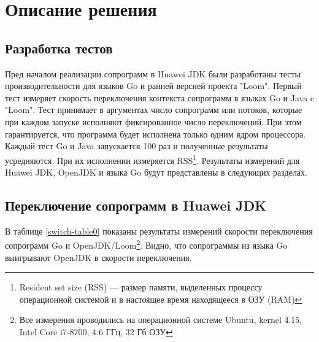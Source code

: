\section{Описание решения}
	
	\subsection{Разработка тестов}
	Пред началом реализации сопрограмм в Huawei JDK были разработаны тесты
	производительности для языков Go и ранней версией проекта "Loom". 
	Первый тест измеряет скорость переключения контекста сопрограмм в языках Go и
	Java c "Loom". Тест принимает в аргументах число сопрограмм или потоков, которые при каждом запуске
	исполняют фиксированное число переключений. При этом гарантируется, что программа будет исполнена 
	только одним ядром процессора. Каждый тест Go и Java запускается 100 раз и полученные результаты усредняются.
	При их исполнении измеряется RSS\footnote{Resident set size (RSS) — размер памяти, 
	выделенных процессу операционной системой и в настоящее время находящееся в ОЗУ (RAM)}.
	Результаты измерений для Huawei JDK, OpenJDK и языка Go будут представлены в следующих разделах.
	\clearpage
	
	\subsection{Переключение сопрограмм в Huawei JDK}
	В таблице \ref{switch-table0} показаны результаты измерений скорости переключения сопрограмм Go и 
	OpenJDK/Loom\footnote{Все измерения проводились на операционной системе Ubuntu, kernel 4.15, Intel Core i7-8700,
	4.6 ГГц, 32 Гб ОЗУ}. Видно, что сопрограммы из языка Go выигрывают OpenJDK в скорости переключения.
	
